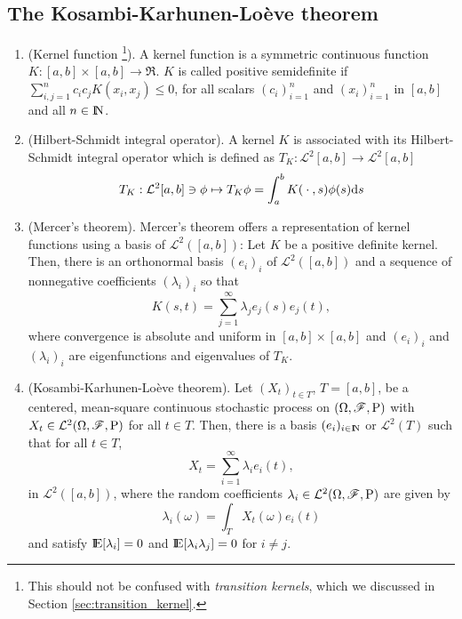 \documentclass[a4paper,10pt]{scrbook}
\begin{document}
\subsection{The Kosambi-Karhunen-Lo{\`e}ve theorem}
\begin{enumerate}
 \item (Kernel function%
      \footnote{This should not be confused with \textit{transition kernels}, 
                which we discussed in Section \ref{sec:transition_kernel}.}).  
       A kernel function is a symmetric continuous function \(K: [a,b] \times [a,b] \to \Re\).
       \(K\) is called positive semidefinite if \(\sum_{i,j=1}^{n} c_i c_j K(x_i,x_j) \leq 0\),
       for all scalars \((c_i)_{i=1}^{n}\) and \((x_i)_{i=1}^{n}\) in \([a,b]\) and all
       \(n\in\N\).
 \item (Hilbert-Schmidt integral operator). A kernel \(K\) is associated with its
       Hilbert-Schmidt integral operator which is defined as \(T_K: \mathcal{L}^2[a,b]\to\mathcal{L}^2[a,b]\)
       \[
        T_K : \mathcal{L}^2[a,b] \ni \phi \mapsto T_K \phi = \int_{a}^{b}K({}\cdot{},s)\phi(s)\mathrm{d} s
       \]
 \item (Mercer's theorem). Mercer's theorem offers a representation of kernel functions 
       using a basis of \(\mathcal{L}^2([a,b])\): Let \(K\) be a positive definite kernel.
       Then, there is an orthonormal basis \((e_i)_{i}\) of $\mathcal{L}^2([a,b])$ and 
       a sequence of nonnegative coefficients \((\lambda_i)_i\) so that 
       \[
        K(s,t) = \sum_{j=1}^{\infty} \lambda_j e_j(s)e_j(t),
       \]
       where convergence is absolute and uniform in \([a,b]\times [a,b]\) and 
       \((e_i)_i\) and \((\lambda_i)_i\) are eigenfunctions and eigenvalues of \(T_K\).
  
 
 \item (Kosambi-Karhunen-Lo{\`e}ve theorem).  Let \((X_t)_{t\in T}\), \(T=[a,b]\), be a 
       centered, mean-square continuous stochastic process on \((\Omega,\mathscr{F},\mathrm{P})\) with \(X_t\in\mathcal{L}^2(\Omega,\mathscr{F},\mathrm{P})\)
       for all \(t\in T\).
       Then, there is a basis \((e_i)_{i\in\N}\) or \(\mathcal{L}^2(T)\) such that for all 
       \(t\in T\),
       \[
         X_t = \sum_{i=1}^{\infty}\lambda_i e_i(t),
       \]
       in \(\mathcal{L}^2([a,b])\), where the random coefficients \(\lambda_i\in\mathcal{L}^2(\Omega,\mathscr{F},\mathrm{P})\) are given by
       \[
        \lambda_i(\omega) = \int_{T}X_t(\omega)e_i(t)
       \]
       and satisfy \(\E[\lambda_i]=0\) and \(\E[\lambda_i \lambda_j] = 0\) for \(i\neq j\).
       

\end{enumerate}
\end{document}

